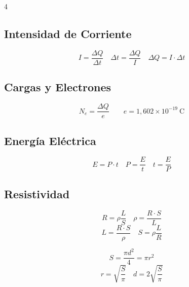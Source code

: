 \documentclass[9pt, landscape, letterpaper]{extarticle}
\begin{document}
\begin{multicols}{4}

  \subsection{Intensidad de Corriente}

  \begin{formulabox}
    $$I = \frac{\Delta Q}{\Delta t} \quad \Delta t = \frac{\Delta Q}{I} \quad \Delta Q = I \cdot \Delta t$$
  \end{formulabox}

  \subsection{Cargas y Electrones}

  \begin{formulabox}
    $$N_e = \frac{\Delta Q}{e} \qquad e = 1{,}602 \times 10^{-19}\ \text{C}$$
  \end{formulabox}

  \subsection{Energía Eléctrica}

  \begin{formulabox}
    $$E = P \cdot t \quad P = \frac{E}{t} \quad t = \frac{E}{P}$$
  \end{formulabox}


  \subsection{Resistividad}

  \begin{formulabox}
    $$R = \rho \frac{L}{S} \quad \rho = \frac{R \cdot S}{L}$$
    $$L = \frac{R \cdot S}{\rho} \quad S = \rho \frac{L}{R}$$
  \end{formulabox}

  \begin{despejesbox}
    $$S = \frac{\pi d^2}{4} = \pi r^2$$
    $$r = \sqrt{\frac{S}{\pi}} \quad d = 2\sqrt{\frac{S}{\pi}}$$
  \end{despejesbox}


\end{multicols}
\end{document}
